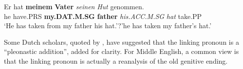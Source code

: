 

 \ea\label{}
\gll Er  hat  \textbf{meinem}\textbf{  Vater} \textit{seinen}\textit{  Hut}\textit{  }genommen.\\


he  have.PRS  \textbf{my.DAT.M.SG} \textbf{father} \textit{his.ACC.M.SG}\textit{  }\textit{hat}\textit{  }take.PP\\

\glt ‘He has taken from my father his hat.’?’he has taken my father’s hat.’

\z

Some Dutch scholars, quoted by \citet[58]{Norde1997}, have suggested that the linking pronoun is a “pleonastic addition”, added for clarity. For Middle English, a common view is that the linking pronoun  is actually a reanalysis of the old genitive ending.


